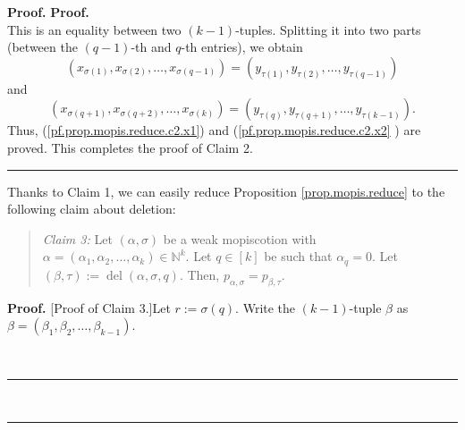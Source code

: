 \documentclass[numbers=enddot,12pt,final,onecolumn,notitlepage]{scrartcl}%
\theoremstyle{definition}
\newenvironment{statement}{\begin{quote}}{\end{quote}}
\newenvironment{fineprint}{\begin{small}}{\end{small}}
\newenvironment{proof}[1][Proof]{\noindent\textbf{#1.} }{\ \rule{0.5em}{0.5em}}
\begin{document}
\begin{fineprint}
\begin{proof}
\begin{proof}
\[\]
This is an equality between two $\left(  k-1\right)  $-tuples. Splitting it
into two parts (between the $\left(  q-1\right)  $-th and $q$-th entries), we
obtain%
\[
\left(  x_{\sigma\left(  1\right)  },x_{\sigma\left(  2\right)  }%
,\ldots,x_{\sigma\left(  q-1\right)  }\right)  =\left(  y_{\tau\left(
1\right)  },y_{\tau\left(  2\right)  },\ldots,y_{\tau\left(  q-1\right)
}\right)
\]
and%
\[
\left(  x_{\sigma\left(  q+1\right)  },x_{\sigma\left(  q+2\right)  }%
,\ldots,x_{\sigma\left(  k\right)  }\right)  =\left(  y_{\tau\left(  q\right)
},y_{\tau\left(  q+1\right)  },\ldots,y_{\tau\left(  k-1\right)  }\right)  .
\]
Thus, (\ref{pf.prop.mopis.reduce.c2.x1}) and (\ref{pf.prop.mopis.reduce.c2.x2}%
) are proved. This completes the proof of Claim 2.
\end{proof}

Thanks to Claim 1, we can easily reduce Proposition \ref{prop.mopis.reduce} to
the following claim about deletion:

\begin{statement}
\textit{Claim 3:} Let $\left(  \alpha,\sigma\right)  $ be a weak mopiscotion
with $\alpha=\left(  \alpha_{1},\alpha_{2},\ldots,\alpha_{k}\right)
\in\mathbb{N}^{k}$. Let $q\in\left[  k\right]  $ be such that $\alpha_{q}=0$.
Let $\left(  \beta,\tau\right)  :=\operatorname*{del}\left(  \alpha
,\sigma,q\right)  $. Then, $p_{\alpha,\sigma}=p_{\beta,\tau}$.
\end{statement}

\begin{proof}
[Proof of Claim 3.]Let $r:=\sigma\left(  q\right)  $. Write the $\left(
k-1\right)  $-tuple $\beta$ as $\beta=\left(  \beta_{1},\beta_{2},\ldots
,\beta_{k-1}\right)  $.


\end{proof}
\end{proof}
\end{fineprint}
\end{document}
